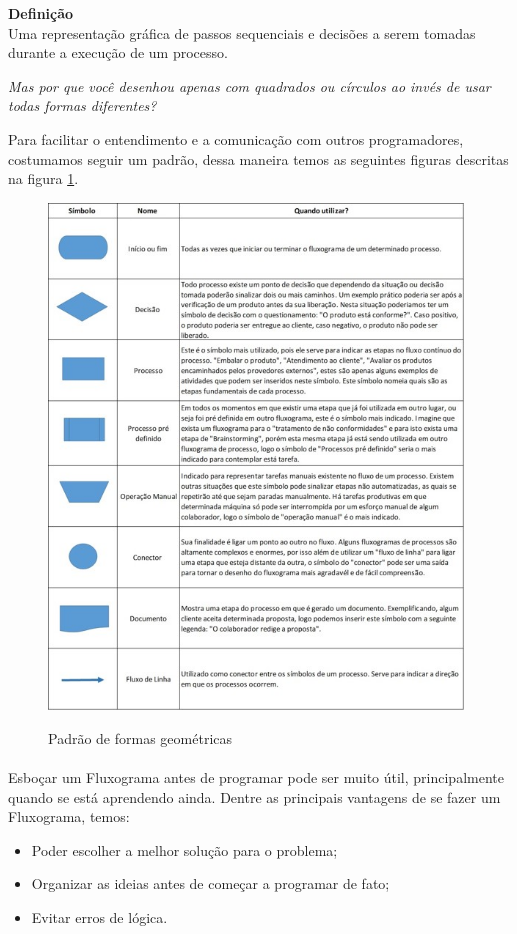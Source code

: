     \begin{center}
    \textbf{Definição} 
    \\
    Uma representação gráfica de passos sequenciais e decisões a serem tomadas durante a execução de um processo.
    \end{center}
    
    \textit{Mas por que você desenhou apenas com quadrados ou círculos ao invés de usar todas formas diferentes?}\par
    Para facilitar o entendimento e a comunicação com outros programadores, costumamos seguir um padrão, dessa maneira temos as seguintes figuras descritas na figura \ref{figura:formas.jpeg}.
    
    \begin{figure}[h]
    \caption{Padrão de formas geométricas}
    \centering 
    \includegraphics[width=11cm]{Figuras/formas.jpg}
    \label{figura:formas.jpeg}
    \end{figure}
     
     \paragraph{}
    Esboçar um Fluxograma antes de programar pode ser muito útil, principalmente quando se está aprendendo ainda. Dentre as principais vantagens de se fazer um Fluxograma, temos:
    \begin{itemize}
        \item Poder escolher a melhor solução para o problema;
        \item Organizar as ideias antes de começar a programar de fato;
        \item Evitar erros de lógica.
    \end{itemize}
    
